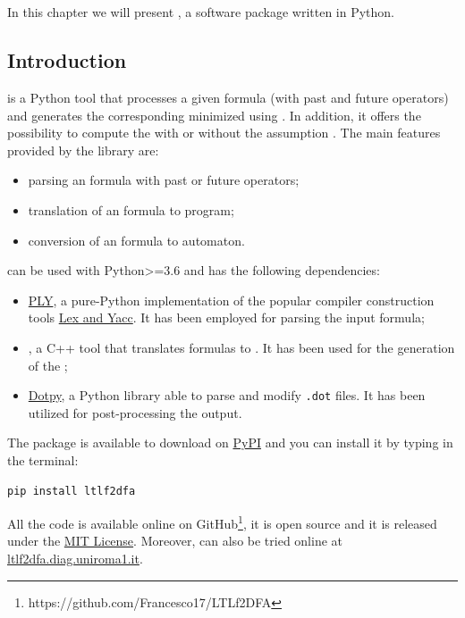 \chapter{\LTLfToDFA}\label{ch:ltlf2dfa}
In this chapter we will present \href{https://github.com/Francesco17/LTLf2DFA}{\LTLfToDFA}, a software package  written in Python. 

\section{Introduction}\label{sec:intro}
\LTLfToDFA is a Python tool that processes a given \LTLf formula (with past and future operators) and generates the corresponding minimized \DFA using \MONA\citep{mona1998}. In addition, it offers the possibility to compute the \DFA with or without the \declare assumption \citep{DeGiacomo:2014:RLF:2893873.2894033}.
The main features provided by the library are:
\begin{itemize}
\item parsing an \LTLf formula with past or future operators;
\item translation of an \LTLf formula to \MONA program;
\item conversion of an \LTLf formula to \DFA automaton.
\end{itemize}
\LTLfToDFA can be used with Python>=3.6 and has the following dependencies:
\begin{itemize}
\item \href{http://www.dabeaz.com/ply/ply.html}{PLY}, a pure-Python implementation of the popular compiler construction tools \href{http://dinosaur.compilertools.net/}{Lex and Yacc}. It has been employed for parsing the input \LTLf formula;
\item \href{http://www.brics.dk/mona/}{\MONA}, a C++ tool that translates formulas to \DFA. It has been used for the generation of the \DFA;
\item \href{https://pypi.org/project/dotpy/}{Dotpy}, a Python library able to parse and modify \texttt{.dot} files. It has been utilized for post-processing the \MONA output.
\end{itemize}
The package is available to download on \href{https://pypi.org/project/ltlf2dfa/}{PyPI} and you can install it by typing in the terminal:
\begin{lstlisting}[language=bash]
pip install ltlf2dfa
\end{lstlisting}
All the code is available online on GitHub\footnote{https://github.com/Francesco17/LTLf2DFA}, it is open source and it is released under the \href{https://github.com/Francesco17/LTLf2DFA/blob/master/LICENSE}{MIT License}.
Moreover, \LTLfToDFA can also be tried online at \href{ltlf2dfa.diag.uniroma1.it}{ltlf2dfa.diag.uniroma1.it}.
